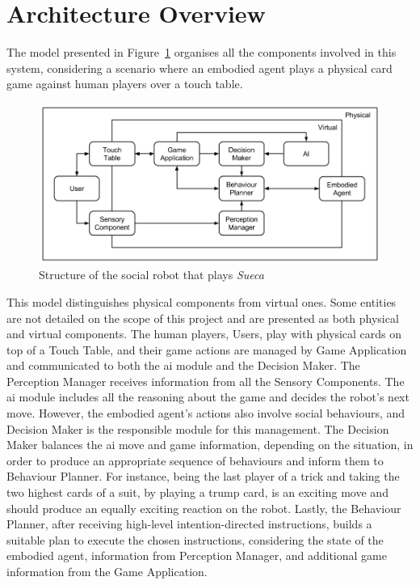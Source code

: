 \section{Architecture Overview}
\label{section:architecture_overview}

The model presented in Figure~\ref{fig:model} organises all the components involved in this system, considering a scenario where an embodied agent plays a physical card game against human players over a touch table.

\begin{figure}[ht]
  \centering
    \includegraphics[width=1\textwidth]{./img/model}
  \caption{Structure of the social robot that plays \emph{Sueca}}
\label{fig:model}
\end{figure}

This model distinguishes physical components from virtual ones.
Some entities are not detailed on the scope of this project and are presented as both physical and virtual components.
The human players, Users, play with physical cards on top of a Touch Table, and their game actions are managed by Game Application and communicated to both the \ac{ai} module and the Decision Maker.
The Perception Manager receives information from all the Sensory Components.
The \ac{ai} module includes all the reasoning about the game and decides the robot's next move.
However, the embodied agent's actions also involve social behaviours, and Decision Maker is the responsible module for this management.
The Decision Maker balances the \ac{ai} move and game information, depending on the situation, in order to produce an appropriate sequence of behaviours and inform them to Behaviour Planner.
For instance, being the last player of a trick and taking the two highest cards of a suit, by playing a trump card, is an exciting move and should produce an equally exciting reaction on the robot.
Lastly, the Behaviour Planner, after receiving high-level intention-directed instructions, builds a suitable plan to execute the chosen instructions, considering the state of the embodied agent, information from Perception Manager, and additional game information from the Game Application.


